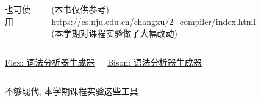 \begin{frame}{}
  \begin{columns}
    \begin{center}
      也可使用
    \end{center}
    \begin{center}
      (本书仅供参考)
      \url{https://cs.nju.edu.cn/changxu/2_compiler/index.html} \\[3pt]
      (本学期对课程实验做了大幅改动)
    \end{center}
  \end{columns}
\end{frame}

\begin{frame}{}
  \begin{columns}
    \begin{center}
      \href{https://en.wikipedia.org/wiki/Flex_(lexical_analyser_generator)}{\footnotesize Flex: 词法分析器生成器}
    \end{center}
    \begin{center}
      \href{https://en.wikipedia.org/wiki/GNU_Bison}{\footnotesize Bison: 语法分析器生成器}
    \end{center}
  \end{columns}

  \vspace{0.50cm}
  \begin{center}
    不够现代, 本学期课程实验这些工具
  \end{center}
\end{frame}

